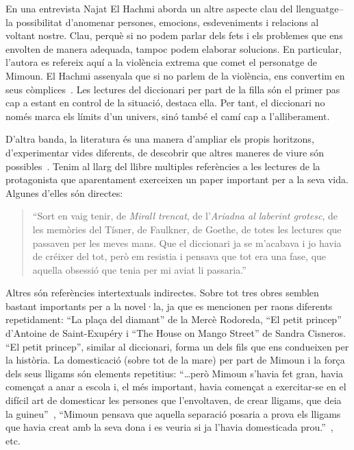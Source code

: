 En una entrevista Najat El Hachmi aborda un altre aspecte clau del llenguatge--la possibilitat d'anomenar persones, emocions, esdeveniments i relacions al voltant nostre.
Clau, perquè si no podem parlar dels fets i els problemes que ens envolten de manera adequada, tampoc podem elaborar solucions.
En particular, l'autora es refereix aquí a la violència extrema que comet el personatge de Mimoun.
El Hachmi assenyala que si no parlem de la violència, ens convertim en seus còmplices~\autocite{HaAM2011}.
Les lectures del diccionari per part de la filla són el primer pas cap a estant en control de la situació, destaca ella.
Per tant, el diccionari no només marca els límits d'un univers, sinó també el camí cap a l'alliberament.

D'altra banda, la literatura és una manera d'ampliar els propis horitzons, d'experimentar vides diferents, de descobrir que altres maneres de viure són possibles~\autocite{HaAM2011}.
Tenim al llarg del llibre multiples referències a les lectures de la protagonista que aparentament exerceixen un paper important per a la seva vida.
Algunes d'elles són directes:
\begin{quote}
  ``Sort en vaig tenir, de \textit{Mirall trencat}, de l'\textit{Ariadna al laberint grotesc}, de les memòries del Tísner, de Faulkner, de Goethe, de totes les lectures que passaven per les meves mans. Que el diccionari ja se m'acabava i jo havia de créixer del tot, però em resistia i pensava que tot era una fase, que aquella obsessió que tenia per mi aviat li passaria.''~\autocite[286]{ElHachmi2008}
\end{quote}

Altres són referències intertextuals indirectes.
Sobre tot tres obres semblen bastant importants per a la novel·la, ja que es mencionen per raons diferents repetidament: ``La plaça del diamant'' de la Mercè Rodoreda, ``El petit princep'' d'Antoine de Saint-Exupéry i ``The House on Mango Street'' de Sandra Cisneros.
``El petit princep'', similar al diccionari, forma un dels fils que ens condueixen per la història.
La domesticació (sobre tot de la mare) per part de Mimoun i la força dels seus lligams són elements repetitius:
``\ldots però Mimoun s'havia fet gran, havia començat a anar a escola i, el més important, havia començat a exercitar-se en el difícil art de domesticar les persones que l'envoltaven, de crear lligams, que deia la guineu''~\autocite[24]{ElHachmi2008},
``Mimoun pensava que aquella separació posaria a prova els lligams que havia creat amb la seva dona i es veuria si ja l'havia domesticada prou.''~\autocite[124]{ElHachmi2008}, etc.

